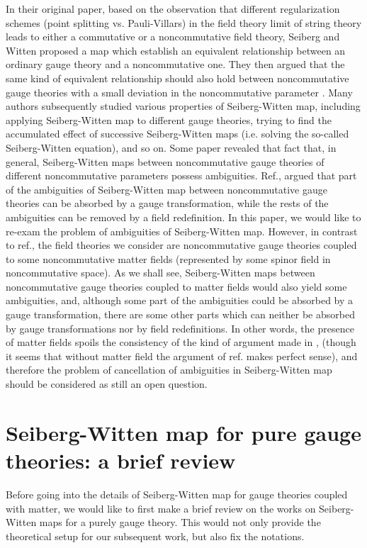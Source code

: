\documentclass[a4paper,a4paper]{article}%
\begin{document}
In their original paper\cite{6}, based on the observation that different
regularization schemes (point splitting vs. Pauli-Villars) in the field theory
limit of string theory leads to either a commutative or a noncommutative field
theory, Seiberg and Witten proposed a map which establish an equivalent
relationship between an ordinary gauge theory and a noncommutative one. They
then argued that the same kind of equivalent relationship should also hold
between noncommutative gauge theories with a small deviation in the
noncommutative parameter \myHighlight{$\theta$}\coordHE{}. Many authors subsequently studied various
properties of Seiberg-Witten map\cite{7,8,9,10}, including applying
Seiberg-Witten map to different gauge theories, trying to find the accumulated
effect of successive Seiberg-Witten maps (i.e. solving the so-called
Seiberg-Witten equation)\cite{11,12}, and so on. Some paper revealed that fact
that, in general, Seiberg-Witten maps between noncommutative gauge theories of
different noncommutative parameters possess ambiguities. Ref.\cite{13}, argued
that part of the ambiguities of Seiberg-Witten map between noncommutative
gauge theories can be absorbed by a gauge transformation, while the rests of
the ambiguities can be removed by a field redefinition. In this paper, we
would like to re-exam the problem of ambiguities of Seiberg-Witten map.
However, in contrast to ref.\cite{13}, the field theories we consider are
noncommutative gauge theories coupled to some noncommutative matter fields
(represented by some spinor field in noncommutative space). As we shall see,
Seiberg-Witten maps between noncommutative gauge theories coupled to matter
fields would also yield some ambiguities, and, although some part of the
ambiguities could be absorbed by a gauge transformation, there are some other
parts which can neither be absorbed by gauge transformations nor by field
redefinitions. In other words, the presence of matter fields spoils the
consistency of the kind of argument made in \cite{13}, (though it seems that
without matter field the argument of ref. \cite{13} makes perfect sense), and
therefore the problem of cancellation of ambiguities in Seiberg-Witten map
should be considered as still an open question.

\section{Seiberg-Witten map for pure gauge theories: a brief review}

Before going into the details of Seiberg-Witten map for gauge theories coupled
with matter, we would like to first make a brief review on the works on
Seiberg-Witten maps for a purely gauge theory. This would not only provide the
theoretical setup for our subsequent work, but also fix the notations.
\end{document}
